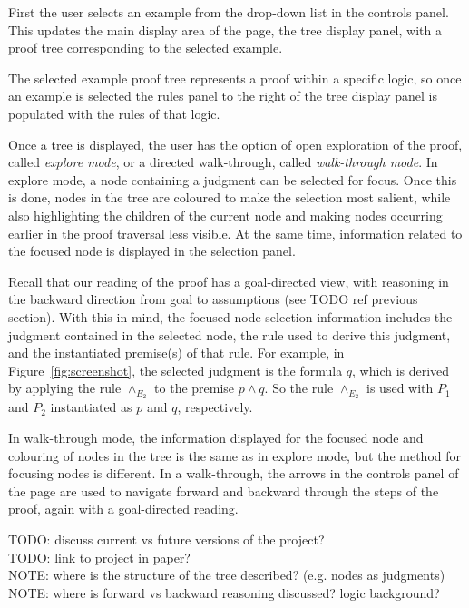 \documentclass[conference]{IEEEtran}
\begin{document}
First the user selects an example from the drop-down list in the controls panel. This updates the main display area of the page, the tree display panel, with a proof tree corresponding to the selected example.

The selected example proof tree represents a proof within a specific logic, so once an example is selected the rules panel to the right of the tree display panel is populated with the rules of that logic.

Once a tree is displayed, the user has the option of open exploration of the proof, called \textit{explore mode}, or a directed walk-through, called \textit{walk-through mode}. In explore mode, a node containing a judgment can be selected for focus. Once this is done, nodes in the tree are coloured to make the selection most salient, while also highlighting the children of the current node and making nodes occurring earlier in the proof traversal less visible. At the same time, information related to the focused node is displayed in the selection panel.

Recall that our reading of the proof has a goal-directed view, with reasoning in the backward direction from goal to assumptions (see TODO ref previous section). With this in mind, the focused node selection information includes the judgment contained in the selected node, the rule used to derive this judgment, and the instantiated premise(s) of that rule. For example, in Figure~\ref{fig:screenshot}, the selected judgment is the formula $q$, which is derived by applying the rule $\wedge_{E_2}$ to the premise $p \wedge q$. So the rule $\wedge_{E_2}$ is used with $P_1$ and $P_2$ instantiated as $p$ and $q$, respectively.

In walk-through mode, the information displayed for the focused node and colouring of nodes in the tree is the same as in explore mode, but the method for focusing nodes is different. In a walk-through, the arrows in the controls panel of the page are used to navigate forward and backward through the steps of the proof, again with a goal-directed reading.

TODO: discuss current vs future versions of the project? \\

TODO: link to project in paper? \\

NOTE: where is the structure of the tree described? (e.g. nodes as judgments) \\

NOTE: where is forward vs backward reasoning discussed? logic background? \\
\end{document}
